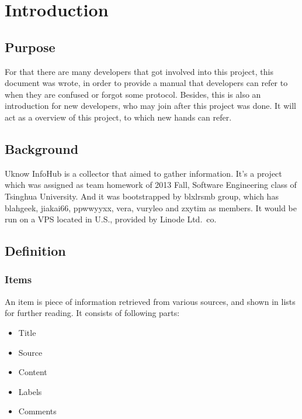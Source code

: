 
\section{Introduction}
  \subsection{Purpose}
    For that there are many developers that got involved into this project,
    this document was wrote, in order to provide a manual that developers can refer to
    when they are confused or forgot some protocol.
    Besides, this is also an introduction for new developers, who may join after this project was done.
    It will act as a overview of this project, to which new hands can refer.

  \subsection{Background}

    Uknow InfoHub is a collector that aimed to gather information.
    It's a project which was assigned as team homework of 2013 Fall, Software Engineering class of Tsinghua University.
    And it was bootstrapped by blxlrsmb group, which has blahgeek, jiakai66, ppwwyyxx, vera, vuryleo and zxytim as members.
    It would be run on a VPS located in U.S., provided by Linode Ltd.\ co.

  \subsection{Definition}
    \subsubsection{Items}

      An item is piece of information retrieved from various sources, and
      shown in lists for further reading. It consists of following parts:

      \begin{itemize}
      \itemsep1pt\parskip0pt
      \item
        Title
      \item
        Source
      \item
        Content
      \item
        Labels
      \item
        Comments
      \end{itemize}

